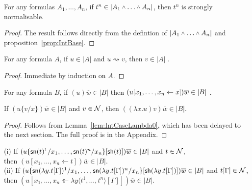 \documentclass{llncs} %
\begin{document}
\begin{proposition}
 For any formulas $A_1,\dots,A_n$, if $t^n \in |A_1\vlan\dots\vlan A_n|$, then $t^n$ is strongly normalisable.
\end{proposition}

\begin{proof}
The result follows directly from the defintion of  $|A_1\vlan\dots\vlan A_n|$ and proposition~\ref{prop:IntBase}. 
\end{proof}

\begin{lemma}\label{lem:RedStab}
For any formula $A$,  if $u\in |A|$ and $u \rightsquigarrow v$, then $v \in |A|$ .
\end{lemma} 

\begin{proof}
 Immediate by induction on $A$.
\end{proof}

\begin{lemma}\label{lem:Red-AddSharings}
For any formula $B$,  if $(u)\overline{w}\in |B|$ then $(u\share xx)\overline{w} \in |B|$ .
\end{lemma} 

\begin{lemma}\label{lem:IntCaseLambda}
If $(u\{v/x\})\overline{w} \in |B|$ and $v\in\mathcal{N}$, then $((\lambda x.u) v)\overline{w} \in |B|$.
\end{lemma}

\begin{proof}
Follows from Lemma~\ref{lem:IntCaseLambda0}, which has been delayed to the next section. The full proof is in the Appendix.
\end{proof}

\begin{lemma}\label{lem:IntCaseSharing} $\;$ \\
(i) If $(u\{{\mathsf{sn}}(t)^1/x_1,\dots,{\mathsf{sn}}(t)^n/x_n\}[{\mathsf{sh}} (t)])\overline{w} \in |B|$ and $t\in\mathcal{N}$, \\ then  $(u[x_1,\dots,x_n \leftarrow t])\overline{w} \in |B|$.
\\
(ii) If $(u\{{\mathsf{sn}}(\lambda y.t[\Gamma])^1/x_1,\dots,{\mathsf{sn}}(\lambda y.t[\Gamma])^n/x_n\}[{\mathsf{sh}} (\lambda y.t[\Gamma])])\overline{w} \in |B|$ and $t[\Gamma]\in\mathcal{N}$, \\ then  $(u[x_1,\dots,x_n \twoheadleftarrow \lambda y\langle t^1,\dots,t^n \rangle[\Gamma]])\overline{w} \in |B|$.
\end{lemma}
\end{document}

